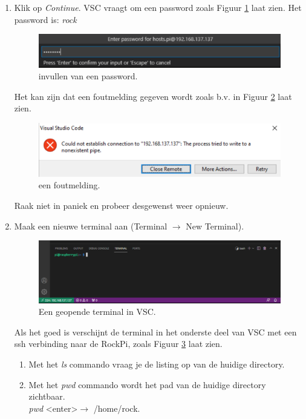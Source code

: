 \begin{enumerate}
\begin{enumerate}
	     \item Klik op \textit{Continue}. VSC vraagt om een password zoals Figuur \ref{fig:vscVrPasswd} laat zien. Het password is: \textit{rock} 
		    \begin{figure}[h!]
	\captionsetup{justification=centering}
	\includegraphics[width=0.7 \linewidth]{figuren/VSCpasswd}
	\centering
	\caption{invullen van een password.}
	\label{fig:vscVrPasswd}
\end{figure}	

Het kan zijn dat een foutmelding gegeven wordt zoals b.v. in Figuur \ref{fig:vscfout1} laat zien. 
		    \begin{figure}[h!]
	\captionsetup{justification=centering}
	\includegraphics[width=0.6 \linewidth]{figuren/VSCfout1}
	\centering
	\caption{een foutmelding.}
	\label{fig:vscfout1}
\end{figure}	
Raak niet in paniek en probeer desgewenst weer opnieuw.
\item Maak een nieuwe terminal aan (Terminal $\rightarrow$ New Terminal). 
\begin{figure}[h!]
	\captionsetup{justification=centering}
	\includegraphics[width=0.6 \linewidth]{figuren/VSCnewTerminal}
	\centering
	\caption{Een geopende terminal in VSC.}
	\label{fig:vscnewTerm}
\end{figure}	
Als het goed is verschijnt de terminal in het onderste deel van VSC met een ssh verbinding naar de RockPi, zoals Figuur \ref{fig:vscnewTerm} laat zien. 
\begin{enumerate}
	\item Met het \textit{ls} commando vraag je de listing op van de huidige directory.
	\item Met het \textit{pwd} commando wordt het pad van de huidige directory zichtbaar.\\
	\textit{pwd} \textless enter\textgreater $\rightarrow$  /home/rock.

\end{enumerate}
\end{enumerate}
\end{enumerate}
